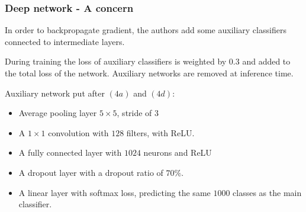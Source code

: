 \begin{frame}
	\frametitle{Deep network - A concern}
	
	In order to backpropagate gradient, the authors add some auxiliary classifiers connected to intermediate layers.
	
	\smallskip 
	During training the loss of auxiliary classifiers is weighted by $0.3$ and added to the total loss of the network. Auxiliary networks are removed at inference time. 
	
	\bigskip 
	
	Auxiliary network put after $(4a)$ and $(4d)$: 
	\begin{itemize}
		\item Average pooling layer $5\times 5$, stride of $3$
		\item A $1 \times 1$ convolution with $128$ filters, with ReLU.
		\item A fully connected layer with $1024$ neurons and ReLU
		\item A dropout layer with a dropout ratio of $70\%$.
		\item A linear layer with softmax loss, predicting the same $1000$ classes as the main classifier.
	\end{itemize}
	
\end{frame}




